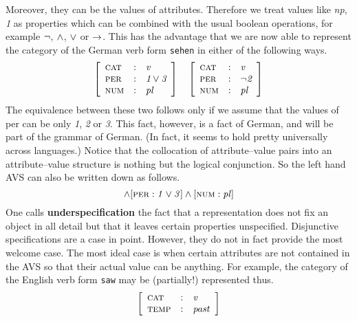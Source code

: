 Moreover, they can be the values of attributes. Therefore we treat 
values like {\it np}, {\it 1\/} as properties which can be combined 
with the usual boolean operations, for example $\neg$, $\wedge$, $\vee$ 
or $\rightarrow$. This has the advantage that we are now able to represent 
the category of the German verb form {\tt sehen} in either of 
the following ways.
\begin{equation}
\left[\begin{array}{l@{\quad : \quad}l}
\mbox{\sc cat} & \mbox{\it v} \\
\mbox{\sc per} & \mbox{\it 1} \oder \mbox{\it 3} \\
\mbox{\sc num} & \mbox{\it pl}
\end{array}\right]
\quad
\left[\begin{array}{l@{\quad : \quad}l}
\mbox{\sc cat} & \mbox{\it v} \\
\mbox{\sc per} & \nicht \mbox{\it 2} \\
\mbox{\sc num} & \mbox{\it pl}
\end{array}\right]
\end{equation}
The equivalence between these two follows only if we assume
that the values of {\sc per} can be only {\it 1}, {\it 2} or 
{\it 3}. This fact, however, is a fact of German, and will be 
part of the grammar of German. (In fact, it seems to hold pretty 
universally across languages.) Notice that the collocation of 
attribute--value pairs into an attribute--value structure is 
nothing but the logical conjunction. So the left hand AVS can 
also be written down as follows.
\begin{equation}
[\mbox{\sc cat} : \mbox{\it v\/}]
\und [\mbox{\sc per} : \mbox{\it 1\/} \oder \mbox{\it 3\/}]
\und [\mbox{\sc num} : \mbox{\it pl\/}]
\end{equation}
One calls \textbf{underspecification}
the fact that a representation does not fix an object in all
detail but that it leaves certain properties unspecified.
Disjunctive specifications are a case in point. However, they
do not in fact provide the most welcome case. The most ideal 
case is when certain attributes are not contained in the AVS
so that their actual value can be anything. For example, the
category of the English verb form {\tt saw} may be (partially!) 
represented thus.
\begin{equation}
\left[\begin{array}{l@{\quad : \quad}l}
\mbox{\sc cat} & \mbox{\it v} \\
\mbox{\sc temp} & \mbox{\it past\/}
\end{array}\right]
\end{equation}
